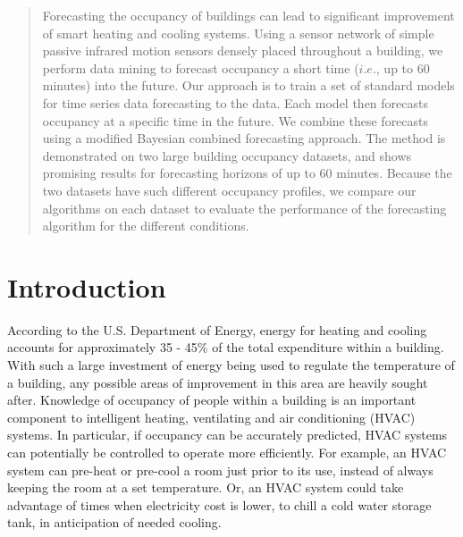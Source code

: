 \documentclass{acm_proc_article-sp}
\begin{document}
\date{6 June 2013}

\maketitle
\begin{abstract}
Forecasting the occupancy of buildings can lead to significant improvement of smart heating and cooling systems. Using a sensor network of simple passive infrared motion sensors densely placed throughout a building, we perform data mining to forecast occupancy a short time ($i.e.$, up to 60 minutes) into the future.  Our approach is to train a set of standard models for time series data forecasting to the data.  Each model then forecasts occupancy at a specific time in the future.  We combine these forecasts using a modified Bayesian combined forecasting approach.  The method is demonstrated on two large building occupancy datasets, and shows promising results for forecasting horizons of up to 60 minutes.  Because the two datasets have such different occupancy profiles, we compare our algorithms on each dataset to evaluate the performance of the forecasting algorithm for the different conditions.
\end{abstract}




\section{Introduction}

According to the U.S. Department of Energy, energy for heating and cooling accounts for approximately 35 - 45\% \cite{DOE2010} of the total expenditure within a building. With such a large investment of energy being used to regulate the temperature of a building, any possible areas of improvement in this area are heavily sought after.  Knowledge of occupancy of people within a building is an important component to intelligent heating, ventilating and air conditioning (HVAC) systems.  In particular, if occupancy can be accurately predicted, HVAC systems can potentially be controlled to operate more efficiently.  For example, an HVAC system can pre-heat or pre-cool a room just prior to its use, instead of always keeping the room at a set temperature.  Or, an HVAC system could take advantage of times when electricity cost is lower, to chill a cold water storage tank, in anticipation of needed cooling.
\end{document}
